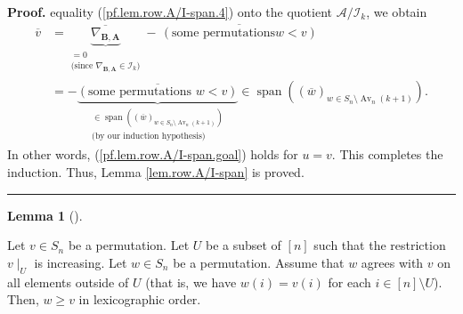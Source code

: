 \documentclass[numbers=enddot,12pt,final,onecolumn,notitlepage]{scrartcl}%
\numberwithin{exer}{subsection}
\theoremstyle{definition}
\newtheorem{lem}[theo]{Lemma}
\newenvironment{lemma}[1][]
{\begin{lem}[#1]\begin{leftbar}}
{\end{leftbar}\end{lem}}
\newenvironment{proof}[1][Proof]{\noindent\textbf{#1.} }{\ \rule{0.5em}{0.5em}}
\begin{document}
\begin{proof}
equality (\ref{pf.lem.row.A/I-span.4}) onto the quotient $\mathcal{A}%
/\mathcal{I}_{k}$, we obtain%
\begin{align*}
\overline{v}  &  =\underbrace{\overline{\nabla_{\mathbf{B},\mathbf{A}}}%
}_{\substack{=0\\\text{(since }\nabla_{\mathbf{B},\mathbf{A}}\in
\mathcal{I}_{k}\text{)}}}-\,\overline{\left(  \text{some permutations
}w<v\right)  }\\
&  =-\underbrace{\overline{\left(  \text{some permutations }w<v\right)  }%
}_{\substack{\in\operatorname*{span}\left(  \left(  \overline{w}\right)
_{w\in S_{n}\setminus\operatorname*{Av}\nolimits_{n}\left(  k+1\right)
}\right)  \\\text{(by our induction hypothesis)}}}\in\operatorname*{span}%
\left(  \left(  \overline{w}\right)  _{w\in S_{n}\setminus\operatorname*{Av}%
\nolimits_{n}\left(  k+1\right)  }\right)  .
\end{align*}
In other words, (\ref{pf.lem.row.A/I-span.goal}) holds for $u=v$. This
completes the induction. Thus, Lemma \ref{lem.row.A/I-span} is proved.
\end{proof}

\begin{lemma}
\label{lem.lex-less-2}Let $v\in S_{n}$ be a permutation. Let $U$ be a subset
of $\left[  n\right]  $ such that the restriction $v\mid_{U}$ is increasing.
Let $w\in S_{n}$ be a permutation. Assume that $w$ agrees with $v$ on all
elements outside of $U$ (that is, we have $w\left(  i\right)  =v\left(
i\right)  $ for each $i\in\left[  n\right]  \setminus U$). Then, $w\geq v$ in
lexicographic order.
\end{lemma}
\end{document}
